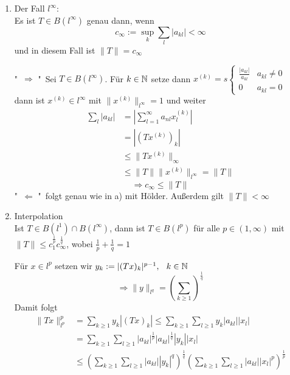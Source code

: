 \begin{beispiel}[Matrizenmultiplikation]
\begin{enumerate}[label=\alph*\upshape)]
\begin{beweis}
		\end{beweis}
	\item Der Fall $l^{\infty}$: \\
		Es ist $T \in B(l^{\infty})$ genau dann, wenn
		\[ c_{\infty} := \sup_{k} \sum_{l} |a_{kl}| < \infty \]
		und in diesem Fall ist $\| T \| = c_{\infty}$
		\begin{beweis}
			"\ $\Rightarrow$ "\  Sei $T \in B(l^{\infty})$.  Für $k \in \mathbb{N}$ setze dann $x^{(k)} = s\begin{cases} \frac{|a_{kl}|}{a_{kl}} & a_{kl} \neq 0 \\ 0 & a_{kl} = 0 \end{cases}$ \\
			dann ist $x^{(k)} \in l^{\infty}$ mit $\| x^{(k)} \|_{l^{\infty}} = 1$ und weiter
			\begin{align*}
				\sum_{l} |a_{kl}| & = | \sum_{l = 1}^{\infty} a_{nl} x_{l}^{(k)} | \\
								  & = | ( T x^{(k)} )_{k} | \\
								  & \leq \| T x^{(k)} \|_{\infty} \\
								  & \leq \| T \| \| x^{(k)} \|_{l^{\infty}} = \| T \|
			\end{align*}			
			\[ \Rightarrow c_{\infty} \leq \| T \| \]
			"\ $\Leftarrow$ "\ folgt genau wie in a) mit Hölder. Au{\ss}erdem gilt $\| T \| < \infty$ 
		\end{beweis}
	\item Interpolation \\
		Ist $T \in B(l^{1}) \cap B(l^{\infty})$, dann ist $T \in B(l^{p})$ für alle $p \in (1, \infty)$ mit $\| T \| \leq c_{1}^{\frac{1}{p}} c_{\infty}^{\frac{1}{q}}$, wobei $\frac{1}{p} + \frac{1}{q} = 1$
		\begin{beweis}
		 Für $x \in l^{p}$ setzen wir $y_{k} := |(T x)_{k}|^{p - 1}, \hspace{0.25cm} k \in \mathbb{N}$ \\
		 \[ \Rightarrow \| y \|_{l^{q}} = \left( \sum_{k \geq 1}  \right)^\frac{1}{q} \]	
		 Damit folgt
		 \begin{align*}
		 	\| Tx \|_{l^{p}}^{p} & = \sum_{k \geq 1 } y_{k} | (Tx)_{k} | \leq \sum_{k \geq 1} \sum_{l \geq 1} y_{k} |a_{kl}| |x_{l}| \\
		 	& = \sum_{k \geq 1} \sum_{l \geq 1} |a_{kl}|^{\frac{1}{p}} |a_{kl}|^{\frac{1}{q}} |y_{k}| |x_{l}| \\
		 	& \leq \left( \sum_{k \geq 1} \sum_{l \geq 1} |a_{kl}| |y_{k}|^{q} \right)^{\frac{1}{q}} \left( \sum_{k \geq 1} \sum_{l \geq 1} |a_{kl}| |x_{l}|^p \right)^{\frac{1}{p}} \\

\end{align*}
\end{beweis}
\end{enumerate}
\end{beispiel}
